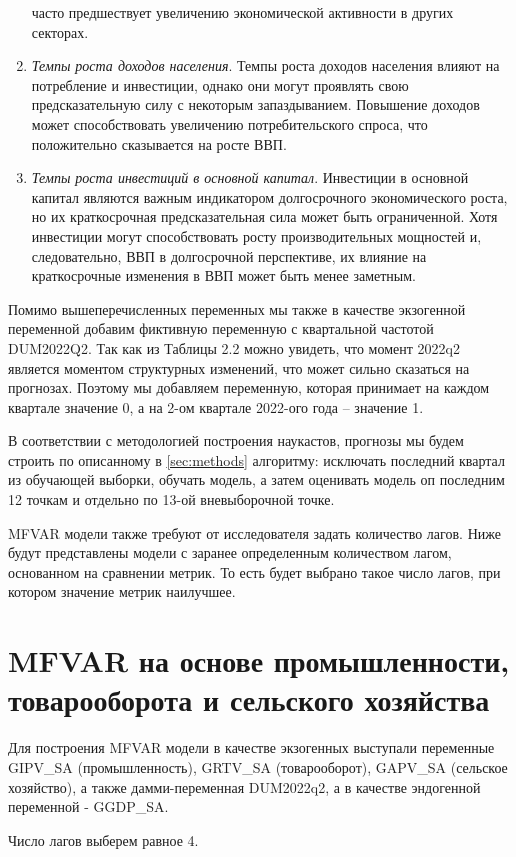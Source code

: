 \documentclass[a4paper, 14pt]{extreport}
\numberwithin{equation}{subsection}
\numberwithin{equation}{section}
\begin{document}
\begin{enumerate}
		часто предшествует увеличению экономической активности в других секторах.
		\item \textit{Темпы роста доходов населения}.
		Темпы роста доходов населения влияют на потребление и инвестиции,
		однако они могут проявлять свою предсказательную силу с некоторым
		запаздыванием. Повышение доходов может способствовать увеличению
		потребительского спроса, что положительно сказывается на росте ВВП.
		\item \textit{Темпы роста инвестиций в основной капитал}.
		Инвестиции в основной капитал являются важным индикатором долгосрочного экономического роста, но их краткосрочная предсказательная
		сила может быть ограниченной. Хотя инвестиции могут способствовать
		росту производительных мощностей и, следовательно, ВВП в долгосрочной перспективе, их влияние на краткосрочные изменения в ВВП может
		быть менее заметным. 
	\end{enumerate}
	
	Помимо вышеперечисленных переменных мы также в качестве экзогенной переменной добавим фиктивную переменную с квартальной частотой DUM2022Q2. Так как из Таблицы 2.2 можно увидеть, что момент 2022q2 является моментом структурных изменений, что может сильно сказаться на прогнозах. Поэтому мы добавляем переменную, которая принимает на каждом квартале значение 0, а на 2-ом квартале 2022-ого года -- значение 1.
	
	В соответствии с методологией построения наукастов, прогнозы мы будем строить по описанному в \ref{sec:methods} алгоритму: исключать последний квартал из обучающей выборки, обучать модель, а затем оценивать модель оп последним 12 точкам и отдельно по 13-ой вневыборочной точке.
	
	MFVAR модели также требуют от исследователя задать количество лагов. Ниже будут представлены модели с заранее определенным количеством лагом, основанном на сравнении метрик. То есть будет выбрано такое число лагов, при котором значение метрик наилучшее.
	\section{MFVAR на основе промышленности, товарооборота и сельского хозяйства}
	Для построения MFVAR модели в качестве экзогенных выступали
	переменные GIPV\_SA (промышленность), GRTV\_SA (товарооборот), GAPV\_SA (сельское хозяйство), а также дамми-переменная
	DUM2022q2, а в качестве эндогенной переменной - GGDP\_SA. 
	
	Число лагов выберем равное 4.
	
\end{document}

